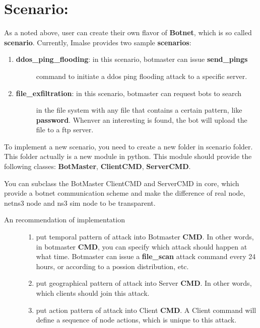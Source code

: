 \documentclass[letterpaper,10pt,english]{sphinxmanual}
\begin{document}
\section{Scenario:}
\label{index:scenario}
As a noted above, user can create their own flavor of \textbf{Botnet}, which is so
called \textbf{scenario}. Currently, Imalse provides two sample \textbf{scenarios}:
\begin{enumerate}
\item {} \begin{description}
\item[{\textbf{ddos\_ping\_flooding}: in this scenario, botmaster can issue \textbf{send\_pings}}] \leavevmode
command to initiate a ddos ping flooding attack to a specific server.

\end{description}

\item {} \begin{description}
\item[{\textbf{file\_exfiltration}: in this scenario, botmaster can request bots to search}] \leavevmode
in the file system with any file that contains a certain pattern,
like \textbf{password}. Whenver an interesting is found, the bot will
upload the file to a ftp server.

\end{description}

\end{enumerate}

To implement a new scenario, you need to create a new folder in scenario
folder. This folder actually is a new module in python. This module should
provide the following classes: \textbf{BotMaster}, \textbf{ClientCMD}, \textbf{ServerCMD}.

You can subclass the BotMaster ClientCMD and ServerCMD in core, which provide a
botnet communication scheme and make the difference of real node, netns3 node
and ns3 sim node to be transparent.
\begin{description}
\item[{An recommendation of implementation}] \leavevmode\begin{enumerate}
\item {} 
put temporal pattern of attack into Botmaster \textbf{CMD}. In other words, in
botmaster \textbf{CMD}, you can specify which attack should happen at what
time. Botmaster can issue a \textbf{file\_scan} attack command every 24 hours,
or according to a possion distribution, etc.

\item {} 
put geographical pattern of attack into Server \textbf{CMD}. In other words,
which clients should join this attack.

\item {} 
put action pattern of attack into Client \textbf{CMD}. A Client command will
define a sequence of node actions, which is unique to this attack.

\end{enumerate}

\end{description}
\end{document}
